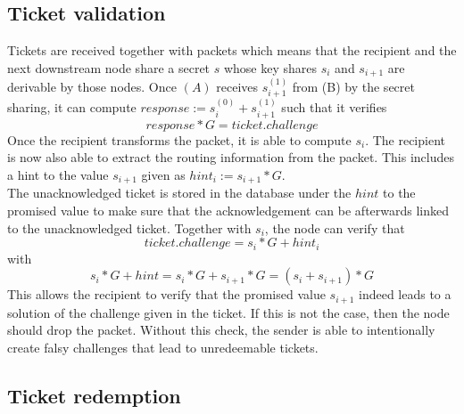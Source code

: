 \subsection{Ticket validation}
Tickets are received together with packets which means that the recipient and the next downstream node share a secret $s$ whose key shares $s_i$ and $s_{i+1}$ are derivable by those nodes.
\newline Once $(A)$ receives $s_{i+1}^{(1)}$ from (B) by the secret sharing, it can compute $response:=s_i^{(0)}+s_{i+1}^{(1)}$ such that it verifies  
$$response*G=ticket.challenge$$
Once the recipient transforms the packet, it is able to compute $s_i$. The recipient is now also able to extract the routing information from the packet. 
This includes a hint to the value $s_{i+1}$ given as $hint_i:=s_{i+1}*G$.
\\The unacknowledged ticket is stored in the database under the $hint$ to the promised value to make sure that the acknowledgement can be afterwards linked to the unacknowledged ticket.
\newline Together with $s_i$, the node can verify that $$ticket.challenge=s_i*G+hint_i$$ with $$s_i*G+hint=s_i*G+s_{i+1}*G=(s_i+s_{i+1})*G$$ 
This allows the recipient to verify that the promised value $s_{i+1}$ indeed leads to a solution of the challenge given in the ticket. 
If this is not the case, then the node should drop the packet.
\newline Without this check, the sender is able to intentionally create falsy challenges that lead to unredeemable tickets.


\subsection{Ticket redemption}


